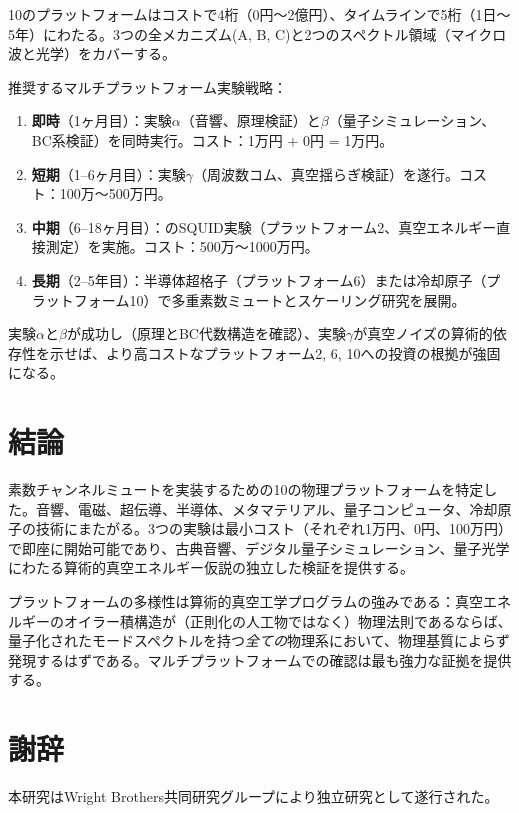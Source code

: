 \documentclass[11pt,a4paper]{article}
\begin{document}
10のプラットフォームはコストで4桁（0円〜2億円）、タイムラインで5桁（1日〜5年）にわたる。3つの全メカニズム(A, B, C)と2つのスペクトル領域（マイクロ波と光学）をカバーする。

推奨するマルチプラットフォーム実験戦略：
\begin{enumerate}
\item \textbf{即時}（1ヶ月目）：実験$\alpha$（音響、原理検証）と$\beta$（量子シミュレーション、BC系検証）を同時実行。コスト：1万円 + 0円 = 1万円。
\item \textbf{短期}（1--6ヶ月目）：実験$\gamma$（周波数コム、真空揺らぎ検証）を遂行。コスト：100万〜500万円。
\item \textbf{中期}（6--18ヶ月目）：\cite{paper_A}のSQUID実験（プラットフォーム2、真空エネルギー直接測定）を実施。コスト：500万〜1000万円。
\item \textbf{長期}（2--5年目）：半導体超格子（プラットフォーム6）または冷却原子（プラットフォーム10）で多重素数ミュートとスケーリング研究を展開。
\end{enumerate}

実験$\alpha$と$\beta$が成功し（原理とBC代数構造を確認）、実験$\gamma$が真空ノイズの算術的依存性を示せば、より高コストなプラットフォーム2, 6, 10への投資の根拠が強固になる。

\section{結論}
\label{sec:conclusion}

素数チャンネルミュートを実装するための10の物理プラットフォームを特定した。音響、電磁、超伝導、半導体、メタマテリアル、量子コンピュータ、冷却原子の技術にまたがる。3つの実験は最小コスト（それぞれ1万円、0円、100万円）で即座に開始可能であり、古典音響、デジタル量子シミュレーション、量子光学にわたる算術的真空エネルギー仮説の独立した検証を提供する。

プラットフォームの多様性は算術的真空工学プログラムの強みである：真空エネルギーのオイラー積構造が（正則化の人工物ではなく）物理法則であるならば、量子化されたモードスペクトルを持つ\emph{全ての}物理系において、物理基質によらず発現するはずである。マルチプラットフォームでの確認は最も強力な証拠を提供する。

\section*{謝辞}
本研究はWright Brothers共同研究グループにより独立研究として遂行された。
\end{document}
